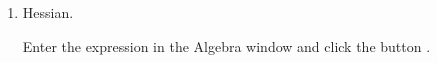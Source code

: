 \begin{enumerate}[leftmargin=*]
\begin{enumerate}
\item Hessian.
\begin{indication}
Enter the expression  in the Algebra window and click the button .
\end{indication}
\end{enumerate}
% 
% 
% 
% 
% 

\end{enumerate}
